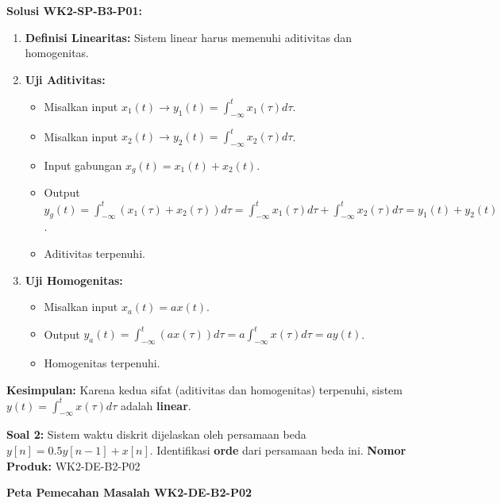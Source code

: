 \documentclass[
  letterpaper,
  DIV=11,
  numbers=noendperiod]{scrreprt}
\providecommand{\tightlist}{%
  \setlength{\itemsep}{0pt}\setlength{\parskip}{0pt}}
\begin{document}
\textbf{Solusi WK2-SP-B3-P01:}

\begin{enumerate}
\def\labelenumi{\arabic{enumi}.}
\tightlist
\item
  \textbf{Definisi Linearitas:} Sistem linear harus memenuhi aditivitas
  dan homogenitas.
\item
  \textbf{Uji Aditivitas:}

  \begin{itemize}
  \tightlist
  \item
    Misalkan input
    \(x_1(t) \rightarrow y_1(t) = \int_{-\infty}^{t} x_1(\tau) d\tau\).
  \item
    Misalkan input
    \(x_2(t) \rightarrow y_2(t) = \int_{-\infty}^{t} x_2(\tau) d\tau\).
  \item
    Input gabungan \(x_g(t) = x_1(t) + x_2(t)\).
  \item
    Output
    \(y_g(t) = \int_{-\infty}^{t} (x_1(\tau) + x_2(\tau)) d\tau = \int_{-\infty}^{t} x_1(\tau) d\tau + \int_{-\infty}^{t} x_2(\tau) d\tau = y_1(t) + y_2(t)\).
  \item
    Aditivitas terpenuhi.
  \end{itemize}
\item
  \textbf{Uji Homogenitas:}

  \begin{itemize}
  \tightlist
  \item
    Misalkan input \(x_a(t) = a x(t)\).
  \item
    Output
    \(y_a(t) = \int_{-\infty}^{t} (a x(\tau)) d\tau = a \int_{-\infty}^{t} x(\tau) d\tau = a y(t)\).
  \item
    Homogenitas terpenuhi.
  \end{itemize}
\end{enumerate}

\textbf{Kesimpulan:} Karena kedua sifat (aditivitas dan homogenitas)
terpenuhi, sistem \(y(t) = \int_{-\infty}^{t} x(\tau) d\tau\) adalah
\textbf{linear}.

\textbf{Soal 2:} Sistem waktu diskrit dijelaskan oleh persamaan beda
\(y[n] = 0.5y[n-1] + x[n]\). Identifikasi \textbf{orde} dari persamaan
beda ini. \textbf{Nomor Produk:} WK2-DE-B2-P02

\textbf{Peta Pemecahan Masalah WK2-DE-B2-P02}
\end{document}
